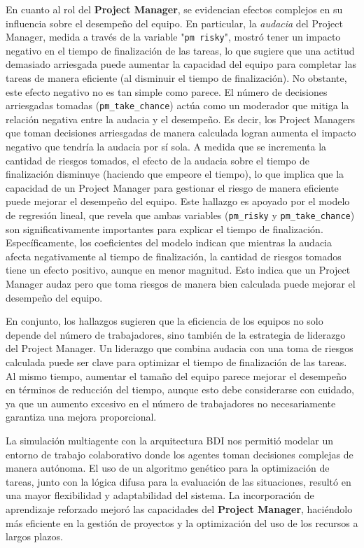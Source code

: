 \documentclass[a4paper, 12pt]{article}
\begin{document}
En cuanto al rol del \textbf{Project Manager}, se evidencian efectos complejos en su influencia sobre el desempeño del equipo. En particular, la \emph{audacia} del Project Manager, medida a través de la variable "\texttt{pm risky}", mostró tener un impacto negativo en el tiempo de finalización de las tareas, lo que sugiere que una actitud demasiado arriesgada puede aumentar la capacidad del equipo para completar las tareas de manera eficiente (al disminuir el tiempo de finalización). No obstante, este efecto negativo no es tan simple como parece. El número de decisiones arriesgadas tomadas (\texttt{pm\_take\_chance}) actúa como un moderador que mitiga la relación negativa entre la audacia y el desempeño. Es decir, los Project Managers que toman decisiones arriesgadas de manera calculada logran aumenta el impacto negativo que tendría la audacia por sí sola. A medida que se incrementa la cantidad de riesgos tomados, el efecto de la audacia sobre el tiempo de finalización disminuye (haciendo que empeore el tiempo), lo que implica que la capacidad de un Project Manager para gestionar el riesgo de manera eficiente puede mejorar el desempeño del equipo. Este hallazgo es apoyado por el modelo de regresión lineal, que revela que ambas variables (\texttt{pm\_risky} y \texttt{pm\_take\_chance}) son significativamente importantes para explicar el tiempo de finalización. Específicamente, los coeficientes del modelo indican que mientras la audacia afecta negativamente al tiempo de finalización, la cantidad de riesgos tomados tiene un efecto positivo, aunque en menor magnitud. Esto indica que un Project Manager audaz pero que toma riesgos de manera bien calculada puede mejorar el desempeño del equipo.

En conjunto, los hallazgos sugieren que la eficiencia de los equipos no solo depende del número de trabajadores, sino también de la estrategia de liderazgo del Project Manager. Un liderazgo que combina audacia con una toma de riesgos calculada puede ser clave para optimizar el tiempo de finalización de las tareas. Al mismo tiempo, aumentar el tamaño del equipo parece mejorar el desempeño en términos de reducción del tiempo, aunque esto debe considerarse con cuidado, ya que un aumento excesivo en el número de trabajadores no necesariamente garantiza una mejora proporcional.

La simulación multiagente con la arquitectura BDI nos permitió modelar un entorno de trabajo colaborativo donde los agentes toman decisiones complejas de manera autónoma. El uso de un algoritmo genético para la optimización de tareas, junto con la lógica difusa para la evaluación de las situaciones, resultó en una mayor flexibilidad y adaptabilidad del sistema. La incorporación de aprendizaje reforzado mejoró las capacidades del \textbf{Project Manager}, haciéndolo más eficiente en la gestión de proyectos y la optimización del uso de los recursos a largos plazos.
\end{document}
